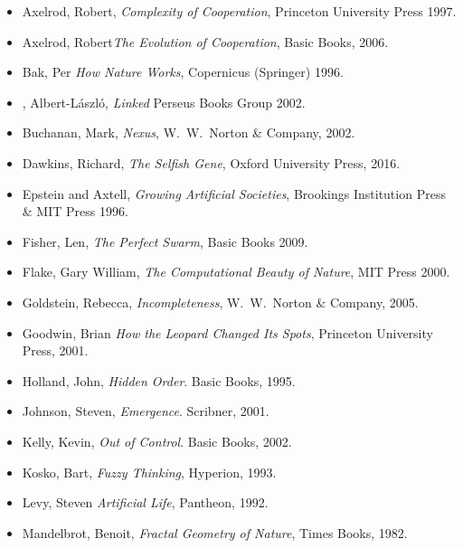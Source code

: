 \documentclass[12pt]{book}
\theoremstyle{exercise}
\begin{document}
\begin{itemize}

\item Axelrod, Robert,  {\it  Complexity of Cooperation},
Princeton University Press 1997.

\item Axelrod, Robert{\it  The Evolution of Cooperation},
Basic Books, 2006.

\item Bak, Per {\it  How Nature Works},
Copernicus (Springer) 1996.

\item \Barabasi, Albert-L\'{a}szl\'{o}, {\it  Linked}
Perseus Books Group 2002.

\item Buchanan, Mark, {\it  Nexus},
W.~W.~Norton \& Company, 2002.

\item Dawkins, Richard, {\it The Selfish Gene}, Oxford University Press, 2016.

\item Epstein and Axtell, {\it  Growing Artificial Societies},
Brookings Institution Press \& MIT Press 1996.

\item Fisher, Len, {\it  The Perfect Swarm},
Basic Books 2009.

\item Flake, Gary William, {\it  The Computational Beauty of Nature}, MIT Press 2000.

\item Goldstein, Rebecca, {\it Incompleteness}, W.~W.~Norton \& Company, 2005.

\item Goodwin, Brian {\it  How the Leopard Changed Its Spots}, Princeton University Press, 2001.

\item Holland, John, {\it  Hidden Order}.
Basic Books, 1995.

\item Johnson, Steven, {\it  Emergence}.
Scribner, 2001.

\item Kelly, Kevin, {\it  Out of Control}.
Basic Books, 2002.

\item Kosko, Bart, {\it Fuzzy Thinking}, Hyperion, 1993.

\item Levy, Steven {\it  Artificial Life}, Pantheon, 1992.

\item Mandelbrot, Benoit, {\it Fractal Geometry of Nature}, Times Books, 1982.


\end{itemize}
\end{document}
